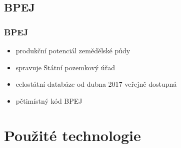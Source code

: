 \documentclass{beamer}
\begin{document}

\subsection{BPEJ}

\begin{frame}

\frametitle{BPEJ}

\begin{itemize}
	\item produkční potenciál zemědělské půdy
	\item spravuje Státní pozemkový úřad
	\item celostátní databáze od dubna 2017 veřejně dostupná
	\item pětimístný kód BPEJ
\end{itemize}

\end{frame}


\section{Použité technologie}
\end{document}
